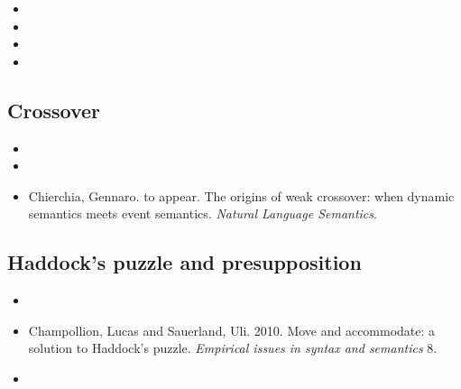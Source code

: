 \documentclass[nols,twoside,nofonts,nobib,nohyper]{tufte-handout}
\begin{document}
\begin{itemize}

\item {}

\item {}

\item {}

\item {}

\end{itemize}

\subsection{Crossover}

\begin{itemize}

    \item {}

  \item {}

  \item Chierchia, Gennaro. to appear. The origins of weak crossover: when dynamic semantics meets event semantics. \textit{Natural Language Semantics}.

\end{itemize}

\subsection{Haddock's puzzle and presupposition}

\begin{itemize}

    \item {}

    \item Champollion, Lucas and Sauerland, Uli. 2010. Move and accommodate: a solution to Haddock’s puzzle. \textit{Empirical issues in syntax and semantics} 8.

    \item {}

\end{itemize}

\end{document}
